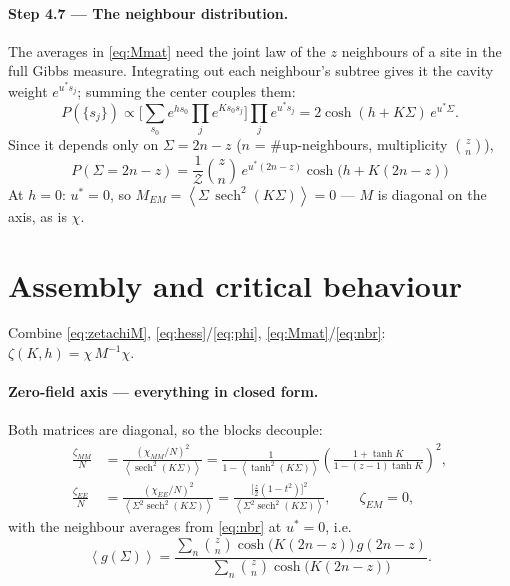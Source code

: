 \documentclass[11pt]{article}
\newcommand{\sech}{\operatorname{sech}}
\newcommand{\avg}[1]{\left\langle #1 \right\rangle}
\newcommand{\Sig}{\Sigma}
\begin{document}
\paragraph{Step 4.7 --- The neighbour distribution.}
The averages in \eqref{eq:Mmat} need the joint law of the $z$ neighbours of a site in the full Gibbs
measure. Integrating out each neighbour's subtree gives it the cavity weight $e^{u^*s_j}$; summing the
center couples them:
\begin{equation}
P(\{s_j\})\propto\Big[\sum_{s_0}e^{hs_0}\prod_j e^{Ks_0s_j}\Big]\prod_j e^{u^*s_j}
=2\cosh(h+K\Sig)\,e^{u^*\Sig}.
\end{equation}
Since it depends only on $\Sig=2n-z$ ($n$ = \#up-neighbours, multiplicity $\binom zn$),
\begin{equation}
\boxed{\;P(\Sig=2n-z)=\frac1{\mathcal Z}\binom{z}{n}\,e^{u^*(2n-z)}\cosh\!\big(h+K(2n-z)\big)\;}
\tag{9}\label{eq:nbr}
\end{equation}
At $h=0$: $u^*=0$, so $M_{EM}=\avg{\Sig\,\sech^2(K\Sig)}=0$ --- $M$ is diagonal on the axis, as is
$\chi$.

\section{Assembly and critical behaviour}

Combine \eqref{eq:zetachiM}, \eqref{eq:hess}/\eqref{eq:phi}, \eqref{eq:Mmat}/\eqref{eq:nbr}:
$\zeta(K,h)=\chi\,M^{-1}\chi$.

\paragraph{Zero-field axis --- everything in closed form.} Both matrices are diagonal, so the blocks
decouple:
\begin{align}
\frac{\zeta_{MM}}N&=\frac{(\chi_{MM}/N)^2}{\avg{\sech^2(K\Sig)}}
=\frac{1}{1-\avg{\tanh^2(K\Sig)}}\left(\frac{1+\tanh K}{1-(z-1)\tanh K}\right)^{2},\\[4pt]
\frac{\zeta_{EE}}N&=\frac{(\chi_{EE}/N)^2}{\avg{\Sig^2\sech^2(K\Sig)}}
=\frac{\big[\tfrac z2(1-t^2)\big]^2}{\avg{\Sig^2\sech^2(K\Sig)}},
\qquad \zeta_{EM}=0,
\end{align}
with the neighbour averages from \eqref{eq:nbr} at $u^*=0$, i.e.
\begin{equation*}
\avg{g(\Sig)}=\frac{\sum_n\binom zn\cosh\!\big(K(2n{-}z)\big)\,g(2n{-}z)}
{\sum_n\binom zn\cosh\!\big(K(2n{-}z)\big)} .
\end{equation*}
\end{document}
